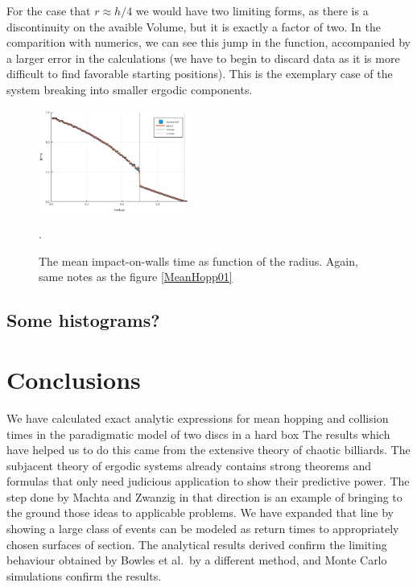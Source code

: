 \documentclass[superscriptaddress,pre,reprint,showpacs,onecolumn]{revtex4-1}
\newcommand{\etal}{et al.\ }
\begin{document}
For the case that $r\approx h/4$ we would have two limiting forms,
as there is a discontinuity on the avaible Volume, but it is exactly
a factor of two. In the comparition with numerics, we can see
this jump in the function, accompanied by a larger error in the
calculations (we have to begin to discard data as it is more difficult
to find favorable starting positions). This is the exemplary case of
the system breaking into smaller ergodic components.


\begin{figure}[h]
  \centering
  \includegraphics[width=0.45\textwidth]{./figures/HitRightWall01.png}
  \caption{The mean impact-on-walls time as function of the radius. Again, same
    notes as the figure \ref{MeanHopp01}}\label{MeanImp01}.
\end{figure}




\subsection{Some histograms?}





\section{Conclusions}

We have calculated exact analytic expressions for mean hopping and
collision times in the paradigmatic model of two discs in a hard box
The results which have helped us to do this came from the
extensive theory of chaotic billiards. The subjacent theory
of ergodic systems already contains strong theorems and formulas
that only need judicious application to show their 
predictive power. The step done by Machta and Zwanzig in
that direction is an example of bringing to the ground those
ideas to applicable problems. We have expanded
that line by showing a large class of events can be modeled
as return times to appropriately chosen surfaces of section. 
The analytical results derived 
confirm the limiting behaviour obtained
by Bowles \etal by a different method, and Monte Carlo simulations confirm 
the results. 
\end{document}
